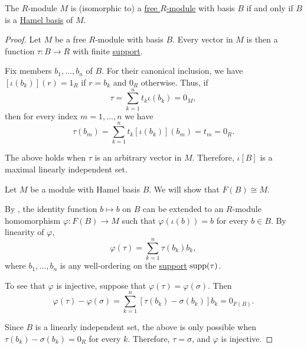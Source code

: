 \begin{proposition}\label{thm:free_module_hamel_basis}
  The \( R \)-module \( M \) is (isomorphic to) a \hyperref[def:free_semimodule]{free \( R \)-module} with basis \( B \) if and only if \( B \) is a \hyperref[def:semimodule_basis/independent]{Hamel basis} of \( M \).
\end{proposition}
\begin{proof}
  \SufficiencySubProof Let \( M \) be a free \( R \)-module with basis \( B \). Every vector in \( M \) is then a function \( \tau: B \to R \) with finite \hyperref[def:function_support]{support}.

  Fix members \( b_1, \ldots, b_n \) of \( B \). For their canonical inclusion, we have \( [\iota(b_k)](r) = 1_R \) if \( r = b_k \) and \( 0_R \) otherwise. Thus, if
  \begin{equation*}
    \tau = \sum_{k=1}^n t_k \iota(b_k) = 0_M,
  \end{equation*}
  then for every index \( m = 1, \ldots, n \) we have
  \begin{equation*}
    \tau(b_m) = \sum_{k=1}^n t_k [\iota(b_k)](b_m) = t_m = 0_R.
  \end{equation*}

  The above holds when \( \tau \) is an arbitrary vector in \( M \). Therefore, \( \iota[B] \) is a maximal linearly independent set.

  \NecessitySubProof Let \( M \) be a module with Hamel basis \( B \). We will show that \( F(B) \cong M \).

  By , the identity function \( b \mapsto b \) on \( B \) can be extended to an \( R \)-module homomorphism \( \varphi: F(B) \to M \) such that \( \varphi(\iota(b)) = b \) for every \( b \in B \). By linearity of \( \varphi \),
  \begin{equation*}
    \varphi(\tau) = \sum_{k=1}^n \tau(b_k) b_k,
  \end{equation*}
  where \( b_1, \ldots, b_n \) is any well-ordering on the \hyperref[def:function_support]{support} \( \operatorname{supp}(\tau) \).

  To see that \( \varphi \) is injective, suppose that \( \varphi(\tau) = \varphi(\sigma) \). Then
  \begin{equation*}
    \varphi(\tau) - \varphi(\sigma) = \sum_{k=1}^n [\tau(b_k) - \sigma(b_k)] b_k = 0_{F(B)}.
  \end{equation*}

  Since \( B \) is a linearly independent set, the above is only possible when \( \tau(b_k) - \sigma(b_k) = 0_R \) for every \( k \). Therefore, \( \tau = \sigma \), and \( \varphi \) is injective.


\end{proof}
